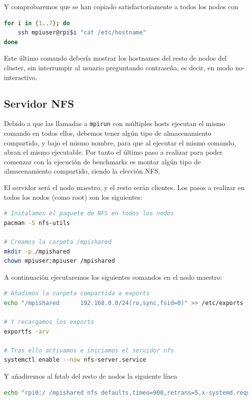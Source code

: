 Y comprobaremos que se han copiado satisfactoriamente a todos los nodos con
\begin{lstlisting}[language=bash]
for i in {1..7}; do
    ssh mpiuser@rpi$i "cat /etc/hostname"
done
\end{lstlisting}
Este último comando debería mostrar los hostnames del resto de nodos del cluster, sin interrumpir al usuario preguntando contraseña, es decir, en modo no-interactivo.


\subsection{Servidor NFS}
Debido a que las llamadas a \texttt{mpirun} con múltiples hosts ejecutan el mismo comando en todos ellos, debemos tener algún tipo de almacenamiento compartido, y bajo el mismo nombre, para que al ejecutar el mismo comando, abran el mismo ejecutable. Por tanto el último paso a realizar para poder comenzar con la ejecución de benchmarks es montar algún tipo de almacenamiento compartido, siendo la elección NFS.

El servidor será el nodo maestro, y el resto serán clientes. Los pasos a realizar en todos los nodos (como root) son los siguientes:

\begin{lstlisting}[language=bash]
# Instalamos el paquete de NFS en todos los nodos
pacman -S nfs-utils

# Creamos la carpeta /mpishared
mkdir -p /mpishared
chown mpiuser:mpiuser /mpishared
\end{lstlisting}

A continuación ejecutaremos los siguientes comandos en el nodo maestro:

\begin{lstlisting}[language=bash]
# Añadimos la carpeta compartida a exports
echo "/mpishared      192.168.0.0/24(ro,sync,fsid=0)" >> /etc/exports

# Y recargamos los exports
exportfs -arv

# Tras ello activamos e iniciamos el servidor nfs
systemctl enable --now nfs-server.service
\end{lstlisting}

Y añadiremos al fstab del resto de nodos la siguiente línea
\begin{lstlisting}[language=bash]
echo "rpi0:/ /mpishared nfs defaults,timeo=900,retrans=5,x-systemd.requires=network-online.target,_netdev 0 0" >> /etc/fstab
\end{lstlisting}

